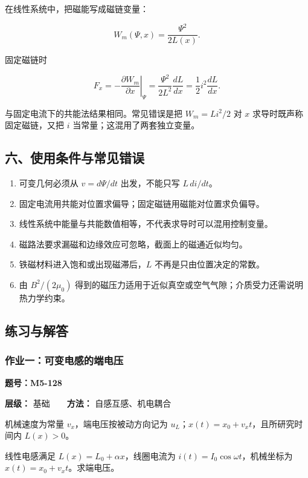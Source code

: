 在线性系统中，把磁能写成磁链变量：

\[
W_m(\Psi,x)=\frac{\Psi^2}{2L(x)}.
\]

固定磁链时

\[
F_x=-\left.\frac{\partial W_m}{\partial x}\right|_{\Psi}
=\frac{\Psi^2}{2L^2}\frac{dL}{dx}
=\frac12i^2\frac{dL}{dx}.
\]

与固定电流下的共能法结果相同。常见错误是把 \(W_m=Li^2/2\) 对 \(x\)
求导时既声称固定磁链，又把 \(i\) 当常量；这混用了两套独立变量。

\subsection{六、使用条件与常见错误}\label{m5:ux516dux4f7fux7528ux6761ux4ef6ux4e0eux5e38ux89c1ux9519ux8bef-1}

\begin{enumerate}
\def\labelenumi{\arabic{enumi}.}
\tightlist
\item
  可变几何必须从 \(v=d\Psi/dt\) 出发，不能只写 \(L\,di/dt\)。
\item
  固定电流用共能对位置求偏导；固定磁链用磁能对位置求负偏导。
\item
  线性系统中能量与共能数值相等，不代表求导时可以混用控制变量。
\item
  磁路法要求漏磁和边缘效应可忽略，截面上的磁通近似均匀。
\item
  铁磁材料进入饱和或出现磁滞后，\(L\) 不再是只由位置决定的常数。
\item
  由 \(B^2/(2\mu_0)\)
  得到的磁压力适用于近似真空或空气气隙；介质受力还需说明热力学约束。
\end{enumerate}

\subsection{练习与解答}\label{m5:ux7ec3ux4e60ux4e0eux89e3ux7b54-6}

\par{}
\noindent\begin{minipage}{\linewidth}

\subsubsection{作业一：可变电感的端电压}\label{m5:ux4f5cux4e1aux4e00ux53efux53d8ux7535ux611fux7684ux7aefux7535ux538b}

\textbf{题号：M5-128}

\textbf{层级：} 基础　　\textbf{方法：} 自感互感、机电耦合

机械速度为常量 \(v_x\)，端电压按被动方向记为
\(u_L\)；\(x(t)=x_0+v_xt\)，且所研究时间内 \(L(x)>0\)。

线性电感满足 \(L(x)=L_0+\alpha x\)，线圈电流为
\(i(t)=I_0\cos\omega t\)，机械坐标为 \(x(t)=x_0+v_xt\)。求端电压。

\end{minipage}\par

